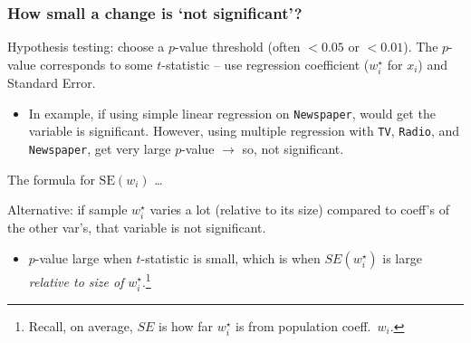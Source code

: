 \documentclass{beamer}
\theoremstyle{example}
\newcommand{\ttt}[1]{{\small\texttt{#1}}}
\begin{document}
\begin{frame}
    \frametitle{How small a change is `not significant'?}
    
    \pause 
    Hypothesis testing: choose a $p$-value threshold (often $<0.05$ or $<0.01$). The $p$-value corresponds to some $t$-statistic {--} use regression coefficient ($w_i^\star$ for $x_i$) and Standard Error.
    \begin{itemize}
        \item In example, if using simple linear regression on \ttt{Newspaper}, would get the variable is significant. However, using multiple regression with \ttt{TV}, \ttt{Radio}, and \ttt{Newspaper}, get very large $p$-value $\to$ so, not significant.
    \end{itemize}
    
    \pause 
    The formula for $\text{SE}(w_i)$ \ldots

    \pause 
    Alternative: if sample $w_i^\star$ varies a lot (relative to its size) compared to coeff's of the other var's, that variable is not significant.  
    \pause
    \begin{itemize}
        \item $p$-value large when $t$-statistic is small, which is when $SE(w_i^\star)$ is large \emph{relative to size of }$w_i^\star$.\qquad\footnote{Recall, on average, $SE$ is how far $w_i^\star$ is from population coeff.\ $w_i$.}
    \end{itemize}
\end{frame}
\end{document}

